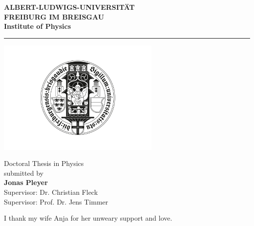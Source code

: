 \begin{titlepage}
    \thispagestyle{empty}
    \begin{center}

        \Large\textbf{ALBERT-LUDWIGS-UNIVERSITÄT\\ FREIBURG IM BREISGAU\\}
        \vspace{0.5cm}
        \Large\textbf{Institute of Physics}

        \rule{\textwidth}{1pt}
        \vspace{1.5cm}

        \Large\textbf{\Title}

        \vspace{1.5cm}

        \includegraphics[width=0.6\textwidth]{logos/uni-fr-sigil-black.png}

        \vfill

        \normalsize
        Doctoral Thesis in Physics\\
        \vspace{0.5cm}
        submitted \Date\hspace{0pt} by\\
        \vspace{0.5cm}
        \Large\textbf{Jonas Pleyer}\\
        \normalsize
        \vspace{0.5cm}
        \large Supervisor: Dr. Christian Fleck\\
        \large Supervisor: Prof. Dr. Jens Timmer\\
        \normalsize

        \newpage
        \thispagestyle{empty}
        I thank my wife Anja for her unweary support and love.

    \end{center}

\end{titlepage}
\thispagestyle{empty}
